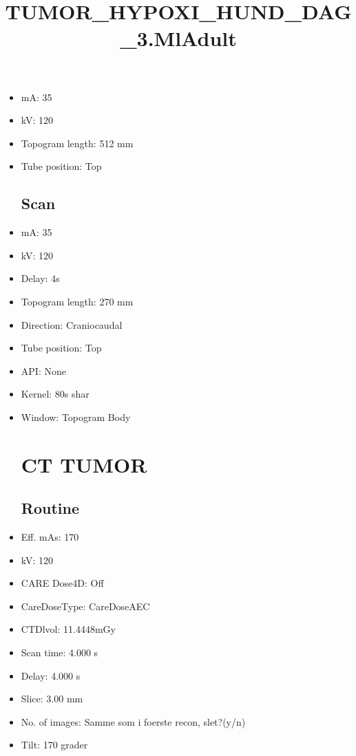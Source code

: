 \documentclass[12pt]{article}
\title{TUMOR\_HYPOXI\_HUND\_DAG\_3.MlAdult}
\begin{document}
\maketitle
\newpage
\tableofcontents
\newpage
{}


\begin{itemize}\section{Topogram}
\subsection{Routine}
\item mA: 35\item kV: 120\item Topogram length: 512 mm\item Tube position: Top
\subsection{Scan}\item mA: 35\item kV: 120\item Delay: 4s\item Topogram length: 270 mm\item Direction: Craniocaudal\item Tube position: Top\item API: None\item Kernel: 80s shar\item Window: Topogram Body
\section{CT TUMOR}
\subsection{Routine}
\item Eff. mAs: 170\item kV: 120\item CARE Dose4D: Off\item CareDoseType: CareDoseAEC\item CTDlvol: 11.4448mGy\item Scan time: 4.000 s\item Delay: 4.000 s\item Slice: 3.00 mm\item No. of images: Samme som i foerste recon, slet?(y/n)\item Tilt: 170 grader

\end{itemize}
\end{document}
